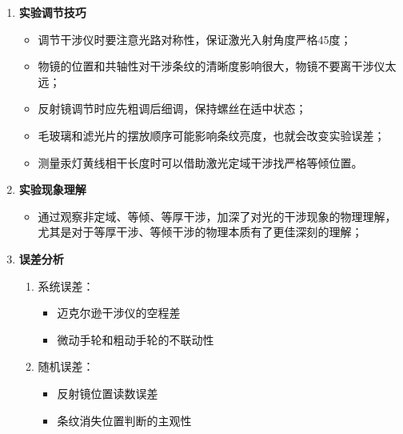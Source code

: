 \documentclass[12pt]{article}
\begin{document}
\begin{enumerate}
    \item \textbf{实验调节技巧}
    \begin{itemize}
        \item 调节干涉仪时要注意光路对称性，保证激光入射角度严格45度；
        \item 物镜的位置和共轴性对干涉条纹的清晰度影响很大，物镜不要离干涉仪太远；
        \item 反射镜调节时应先粗调后细调，保持螺丝在适中状态；
        \item 毛玻璃和滤光片的摆放顺序可能影响条纹亮度，也就会改变实验误差；
        \item 测量汞灯黄线相干长度时可以借助激光定域干涉找严格等倾位置。
    \end{itemize}

    \item \textbf{实验现象理解}
    \begin{itemize}
        \item 通过观察非定域、等倾、等厚干涉，加深了对光的干涉现象的物理理解，尤其是对于等厚干涉、等倾干涉的物理本质有了更佳深刻的理解；
    \end{itemize}

    \item \textbf{误差分析}
    \begin{enumerate}
        \item 系统误差：
        \begin{itemize}
            \item 迈克尔逊干涉仪的空程差
            \item 微动手轮和粗动手轮的不联动性
        \end{itemize}
        \item 随机误差：
        \begin{itemize}
            \item 反射镜位置读数误差
            \item 条纹消失位置判断的主观性
        \end{itemize}
    \end{enumerate}
\end{enumerate}
\end{document}
